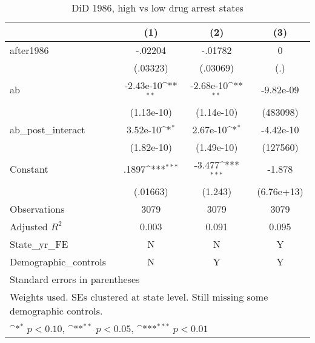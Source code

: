 \begin{table}[htbp]\centering
\def\sym#1{\ifmmode^{#1}\else\(^{#1}\)\fi}
\caption{DiD 1986, high vs low drug arrest states}
\begin{tabular}{l*{3}{c}}
\hline\hline
                    &\multicolumn{1}{c}{(1)}         &\multicolumn{1}{c}{(2)}         &\multicolumn{1}{c}{(3)}         \\
\hline
after1986           &     -.02204         &     -.01782         &           0         \\
                    &    (.03323)         &    (.03069)         &         (.)         \\
[1em]
ab                  &   -2.43e-10\sym{**} &   -2.68e-10\sym{**} &   -9.82e-09         \\
                    &  (1.13e-10)         &  (1.14e-10)         &    (483098)         \\
[1em]
ab\_post\_interact    &    3.52e-10\sym{*}  &    2.67e-10\sym{*}  &   -4.42e-10         \\
                    &  (1.82e-10)         &  (1.49e-10)         &    (127560)         \\
[1em]
Constant            &       .1897\sym{***}&      -3.477\sym{***}&      -1.878         \\
                    &    (.01663)         &     (1.243)         &  (6.76e+13)         \\
\hline
Observations        &        3079         &        3079         &        3079         \\
Adjusted \(R^{2}\)  &       0.003         &       0.091         &       0.095         \\
State\_yr\_FE         &           N         &           N         &           Y         \\
Demographic\_controls&           N         &           Y         &           Y         \\
\hline\hline
\multicolumn{4}{l}{\footnotesize Standard errors in parentheses}\\
\multicolumn{4}{l}{\footnotesize Weights used. SEs clustered at state level. Still missing some demographic controls.}\\
\multicolumn{4}{l}{\footnotesize \sym{*} \(p<0.10\), \sym{**} \(p<0.05\), \sym{***} \(p<0.01\)}\\
\end{tabular}
\end{table}

